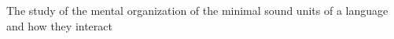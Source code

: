 The study of the mental organization of the minimal sound units of a language and how they interact
